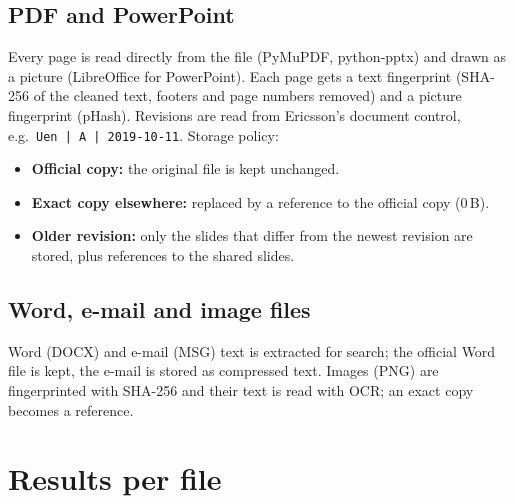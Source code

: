 \documentclass[11pt,a4paper]{article}
\begin{document}
\subsection{PDF and PowerPoint}
Every page is read directly from the file (PyMuPDF, python-pptx) and drawn as a picture (LibreOffice for PowerPoint).
Each page gets a text fingerprint (SHA-256 of the cleaned text, footers and page numbers removed) and a picture fingerprint (pHash).
Revisions are read from Ericsson's document control, e.g.\ \texttt{Uen | A | 2019-10-11}. Storage policy:
\begin{itemize}
  \item \textbf{Official copy:} the original file is kept unchanged.
  \item \textbf{Exact copy elsewhere:} replaced by a reference to the official copy (0\,B).
  \item \textbf{Older revision:} only the slides that differ from the newest revision are stored, plus references to the shared slides.
\end{itemize}

\subsection{Word, e-mail and image files}
Word (DOCX) and e-mail (MSG) text is extracted for search; the official Word file is kept, the e-mail is stored as compressed text.
Images (PNG) are fingerprinted with SHA-256 and their text is read with OCR; an exact copy becomes a reference.

\section{Results per file}
\end{document}
